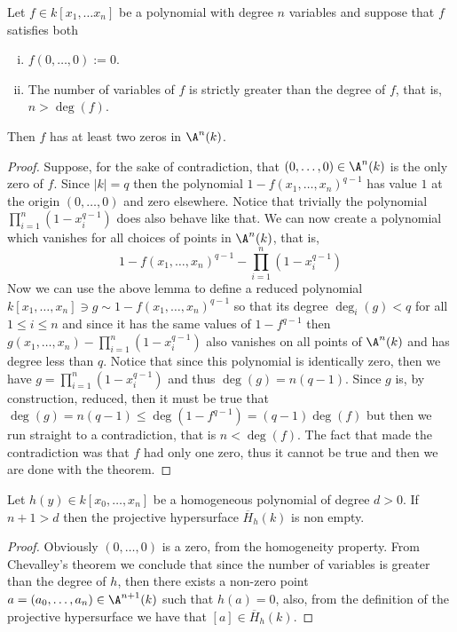 \begin{theorem}[Chevalley]
    Let \(f \in k[x_1, \dots x_n]\) be a polynomial with degree \(n\) variables
    and suppose that \(f\) satisfies both
    \begin{enumerate}[i.]
        \item \(f(0, \dots, 0) := 0\).
        \item The number of variables of \(f\) is strictly greater than the
              degree of \(f\), that is, \(n > \deg(f)\).
    \end{enumerate}
    Then \(f\) has at least two zeros in \(\A^n(k)\).
\end{theorem}

\begin{proof}
    Suppose, for the sake of contradiction, that \((0, \dots, 0) \in \A^n(k)\) is
    the only zero of \(f\). Since \(|k| = q\) then the polynomial \(1 - f(x_1,
    \dots, x_n)^{q-1}\) has value \(1\) at the origin \((0, \dots, 0)\) and zero
    elsewhere. Notice that trivially the polynomial \(\prod_{i=1}^{n}
    (1-x_i^{q-1})\) does also behave like that. We can now create a polynomial
    which vanishes for all choices of points in \(\A^n(k)\), that is,
    \[
        1 - f(x_1,\dots,x_n)^{q-1} - \prod_{i=1}^{n} (1 - x_i^{q-1})
    \]
    Now we can use the above lemma to define a reduced polynomial \(k[x_1, \dots,
            x_n] \ni g \sim 1 - f(x_1, \dots, x_n)^{q-1}\) so that its degree \(\deg_i(g)
    < q\) for all \(1 \leqslant i \leqslant n\) and since it has the same values
    of \(1 - f^{q-1}\) then \(g(x_1, \dots, x_n) - \prod_{i=1}^n(1-x_i^{q-1})\)
    also vanishes on all points of \(\A^n(k)\) and has degree less than \(q\).
    Notice that since this polynomial is identically zero, then we have \(g =
    \prod_{i=1}^n (1 - x_i^{q-1})\) and thus \(\deg(g) = n(q-1)\). Since \(g\)
    is, by construction, reduced, then it must be true that \(\deg(g) = n(q-1)
    \leqslant \deg(1 - f^{q-1}) = (q-1)\deg(f)\) but then we run straight to a
    contradiction, that is \(n < \deg(f)\). The fact that made the contradiction
    was that \(f\) had only one zero, thus it cannot be true and then we are done
    with the theorem.
\end{proof}

\begin{corollary}
    Let \(h(y) \in k[x_0, \dots, x_n]\) be a homogeneous polynomial of degree \(d
    > 0\). If \(n + 1 > d\) then the projective hypersurface \(\overline{H}_h(k)\)
    is non empty.
\end{corollary}

\begin{proof}
    Obviously \((0, \dots, 0)\) is a zero, from the homogeneity property. From
    Chevalley's theorem we conclude that since the number of variables is greater
    than the degree of  \(h\), then there exists a non-zero point \(a = (a_0, \dots,
    a_n) \in \A^{n+1}(k)\) such that \(h(a) = 0\), also, from the definition of
    the projective hypersurface we have that \([a]  \in \overline{H}_h(k)\).
\end{proof}
